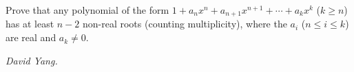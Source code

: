 Prove that any polynomial of the form $1+a_nx^n + a_{n+1}x^{n+1} + \cdots + a_kx^k$ ($k\ge n$) has at least $n-2$ non-real roots (counting multiplicity), where the $a_i$ ($n\le i\le k$) are real and $a_k\ne 0$.

\textit{David Yang.}